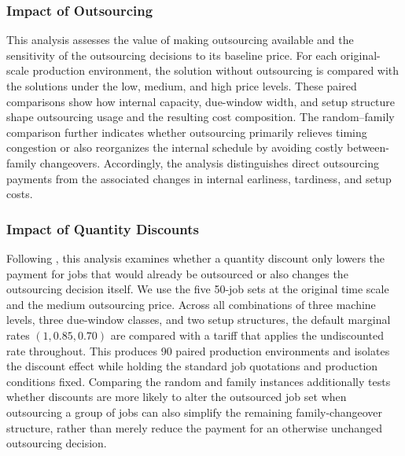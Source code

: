 \subsubsection{Impact of Outsourcing}\label{sec:impact-outsourcing}

This analysis assesses the value of making outsourcing available and the sensitivity
of the outsourcing decisions to its baseline price. For each original-scale
production environment, the solution without outsourcing is compared with the
solutions under the low, medium, and high price levels. These paired comparisons show
how internal capacity, due-window width, and setup structure shape outsourcing usage
and the resulting cost composition. The random--family comparison further indicates
whether outsourcing primarily relieves timing congestion or also reorganizes the
internal schedule by avoiding costly between-family changeovers. Accordingly, the
analysis distinguishes direct outsourcing payments from the associated changes in
internal earliness, tardiness, and setup costs.

\subsubsection{Impact of Quantity Discounts}\label{sec:impact-discounts}

Following \citet{dabia2019rich}, this analysis examines whether a quantity discount
only lowers the payment for jobs that would already be outsourced or also changes the
outsourcing decision itself. We use the five 50-job sets at the original time scale
and the medium outsourcing price. Across all combinations of three machine levels,
three due-window classes, and two setup structures, the default marginal rates
$(1,0.85,0.70)$ are compared with a tariff that applies the undiscounted rate
throughout. This produces 90 paired production environments and isolates the discount
effect while holding the standard job quotations and production conditions fixed.
Comparing the random and family instances additionally tests whether discounts are
more likely to alter the outsourced job set when outsourcing a group of jobs can also
simplify the remaining family-changeover structure, rather than merely reduce the
payment for an otherwise unchanged outsourcing decision.
